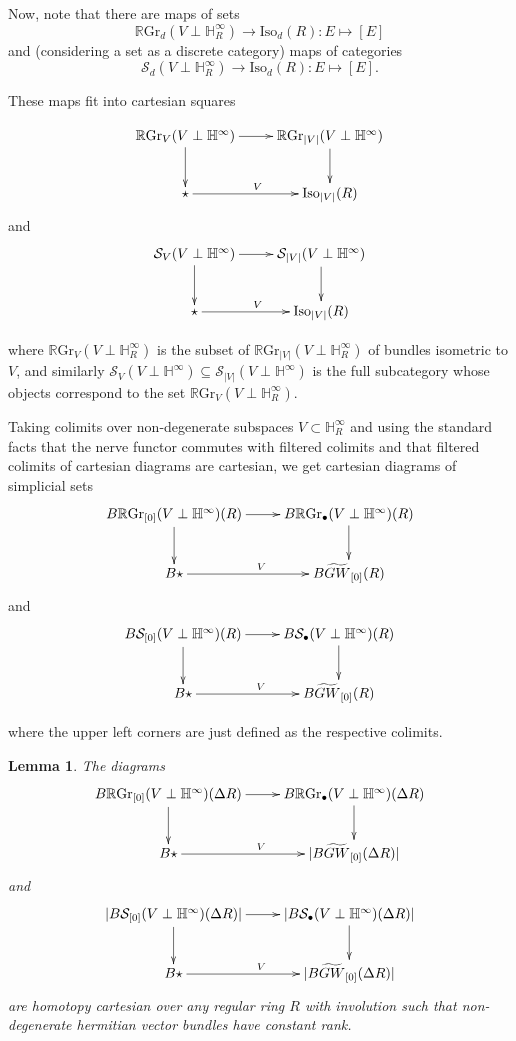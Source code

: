 \documentclass[draftthesis,tocnosub,noragright,centerchapter,10pt]{uiucthesis2009}
\newcommand{\mbb}{\mathbb}
\newcommand{\mc}{\mathcal}
\newcommand{\RGr}{\mathbb R\mathrm{Gr}}
\newcommand{\Iso}{\mathrm{Iso}}
\theoremstyle{plain}
\newtheorem{lemma}{Lemma}
\theoremstyle{definition}
\begin{document}
Now, note that there are maps of sets
\[
\RGr_d(V \perp \mbb H^\infty_R) \rightarrow \Iso_d(R): E \mapsto [E]
\]
and (considering a set as a discrete category) maps of categories
\[
\mc S_d(V \perp \mbb H^\infty_R) \rightarrow \Iso_d(R) : E \mapsto [E].
\]

These maps fit into cartesian squares

\[
\xymatrix{\RGr_V(V \perp \mbb H^\infty) \ar[r]\ar[d] & \RGr_{|V|}(V
  \perp \mbb H^\infty) \ar[d] \\ \star \ar[r]^V & \Iso_{|V|}(R)}
\]
and 
\[
\xymatrix{\mc S_V(V \perp \mbb H^\infty) \ar[r]\ar[d] & \mc S_{|V|}(V
  \perp \mbb H^\infty) \ar[d] \\ \star \ar[r]^V & \Iso_{|V|}(R)}
\]

where $\RGr_V(V \perp \mbb H^\infty_R)$ is the subset of $\RGr_{|V|}(V
\perp \mbb H^\infty_R)$ of bundles isometric to $V$, and similarly
$\mc S_V(V \perp \mbb H^\infty) \subseteq \mc S_{|V|}(V \perp \mbb H^\infty)$ is the full subcategory whose objects
correspond to the set $\RGr_V(V \perp \mbb H^\infty_R)$.

Taking colimits over non-degenerate subspaces $V \subset \mbb
H^\infty_R$ and using the standard facts that the nerve functor commutes with filtered colimits and
that filtered colimits of cartesian diagrams are cartesian, we get cartesian diagrams of simplicial sets
\[
\xymatrix{B\RGr_{[0]}(V \perp \mbb H^\infty)(R) \ar[r]\ar[d] & B\RGr_\bullet(V
  \perp \mbb H^\infty)(R) \ar[d] \\ B\star \ar[r]^V & B\widetilde{GW}_{[0]}(R)}
\]
and 
\[
\xymatrix{B\mc S_{[0]}(V \perp \mbb H^\infty)(R) \ar[r]\ar[d] & B\mc S_\bullet(V
  \perp \mbb H^\infty)(R) \ar[d] \\ B\star \ar[r]^V & B\widetilde{GW}_{[0]}(R)}
\]

where the upper left corners are just defined as the respective colimits. 

\begin{lemma}
The diagrams
\[
\xymatrix{B\RGr_{[0]}(V \perp \mbb H^\infty)(\Delta R) \ar[r]\ar[d] & B\RGr_\bullet(V
  \perp \mbb H^\infty)(\Delta R) \ar[d] \\ B\star \ar[r]^V & |B\widetilde{GW}_{[0]}(\Delta R)|}
\]
and 
\[
\xymatrix{|B\mc S_{[0]}(V \perp \mbb H^\infty)(\Delta R)| \ar[r]\ar[d] & |B\mc S_\bullet(V
  \perp \mbb H^\infty)(\Delta R)| \ar[d] \\ B\star \ar[r]^V &
  |B\widetilde{GW}_{[0]}(\Delta R)|}
\]
are homotopy cartesian over any regular ring $R$ with involution such that
non-degenerate hermitian vector bundles have constant rank.
\end{lemma}
\end{document}

